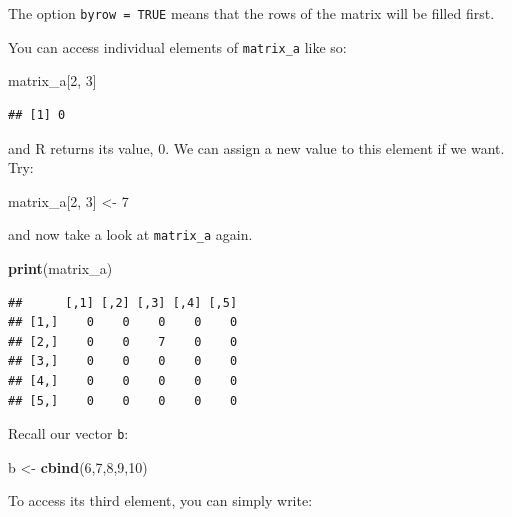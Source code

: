 \documentclass[]{gitbook}
\newenvironment{Shaded}{\begin{snugshade}}{\end{snugshade}}
\newcommand{\DecValTok}[1]{\textcolor[rgb]{0.00,0.00,0.81}{#1}}
\newcommand{\KeywordTok}[1]{\textcolor[rgb]{0.13,0.29,0.53}{\textbf{#1}}}
\newcommand{\NormalTok}[1]{#1}
\newcommand{\StringTok}[1]{\textcolor[rgb]{0.31,0.60,0.02}{#1}}
\begin{document}
The option \texttt{byrow\ =\ TRUE} means that the rows of the matrix will be filled first.

You can access individual elements of \texttt{matrix\_a} like so:

\begin{Shaded}
\begin{Highlighting}[]
\NormalTok{matrix_a[}\DecValTok{2}\NormalTok{, }\DecValTok{3}\NormalTok{]}
\end{Highlighting}
\end{Shaded}

\begin{verbatim}
## [1] 0
\end{verbatim}

and R returns its value, 0. We can assign a new value to this element if we want. Try:

\begin{Shaded}
\begin{Highlighting}[]
\NormalTok{matrix_a[}\DecValTok{2}\NormalTok{, }\DecValTok{3}\NormalTok{] <-}\StringTok{ }\DecValTok{7}
\end{Highlighting}
\end{Shaded}

and now take a look at \texttt{matrix\_a} again.

\begin{Shaded}
\begin{Highlighting}[]
\KeywordTok{print}\NormalTok{(matrix_a)}
\end{Highlighting}
\end{Shaded}

\begin{verbatim}
##      [,1] [,2] [,3] [,4] [,5]
## [1,]    0    0    0    0    0
## [2,]    0    0    7    0    0
## [3,]    0    0    0    0    0
## [4,]    0    0    0    0    0
## [5,]    0    0    0    0    0
\end{verbatim}

Recall our vector \texttt{b}:

\begin{Shaded}
\begin{Highlighting}[]
\NormalTok{b <-}\StringTok{ }\KeywordTok{cbind}\NormalTok{(}\DecValTok{6}\NormalTok{,}\DecValTok{7}\NormalTok{,}\DecValTok{8}\NormalTok{,}\DecValTok{9}\NormalTok{,}\DecValTok{10}\NormalTok{)}
\end{Highlighting}
\end{Shaded}

To access its third element, you can simply write:
\end{document}
